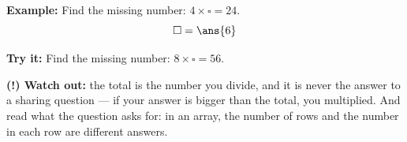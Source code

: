 \documentclass[12pt]{article}
\begin{document}
\begin{examplebox}
\textbf{Example:} Find the missing number: $4 \times \square = 24$.
\[ \square = \ans{6} \]
\end{examplebox}

\begin{tryitbox}
\textbf{Try it:} Find the missing number: $8 \times \square = 56$.\\[2pt]
\end{tryitbox}

\begin{watchoutbox}
\textbf{(!) Watch out:} the total is the number you divide, and it is never the
answer to a sharing question --- if your answer is bigger than the total, you
multiplied. And read what the question asks for: in an array, the number of rows
and the number in each row are different answers.
\end{watchoutbox}
\end{document}
